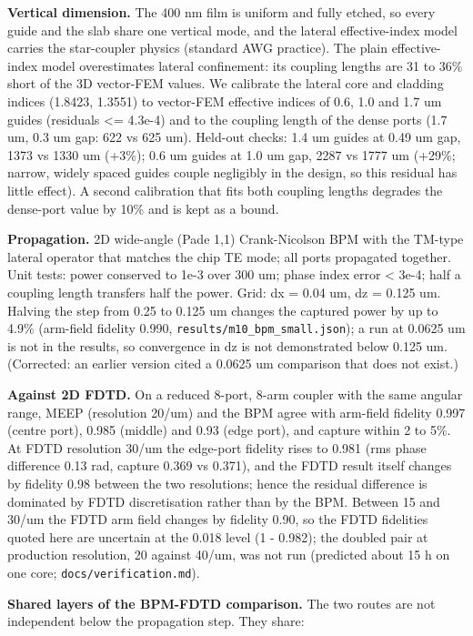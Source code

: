 \textbf{Vertical dimension.} The 400 nm film is uniform and fully
etched, so every guide and the slab share one vertical mode, and the
lateral effective-index model carries the star-coupler physics (standard
AWG practice). The plain effective-index model overestimates lateral
confinement: its coupling lengths are 31 to 36\% short of the 3D
vector-FEM values. We calibrate the lateral core and cladding indices
(1.8423, 1.3551) to vector-FEM effective indices of 0.6, 1.0 and 1.7 um
guides (residuals \textless= 4.3e-4) and to the coupling length of the
dense ports (1.7 um, 0.3 um gap: 622 vs 625 um). Held-out checks: 1.4 um
guides at 0.49 um gap, 1373 vs 1330 um (+3\%); 0.6 um guides at 1.0 um
gap, 2287 vs 1777 um (+29\%; narrow, widely spaced guides couple
negligibly in the design, so this residual has little effect). A second
calibration that fits both coupling lengths degrades the dense-port
value by 10\% and is kept as a bound.

\textbf{Propagation.} 2D wide-angle (Pade 1,1) Crank-Nicolson BPM with
the TM-type lateral operator that matches the chip TE mode; all ports
propagated together. Unit tests: power conserved to 1e-3 over 300 um;
phase index error \textless{} 3e-4; half a coupling length transfers
half the power. Grid: dx = 0.04 um, dz = 0.125 um. Halving the step from
0.25 to 0.125 um changes the captured power by up to 4.9\% (arm-field
fidelity 0.990, \texttt{results/m10\_bpm\_small.json}); a run at 0.0625
um is not in the results, so convergence in dz is not demonstrated below
0.125 um. (Corrected: an earlier version cited a 0.0625 um comparison
that does not exist.)

\textbf{Against 2D FDTD.} On a reduced 8-port, 8-arm coupler with the
same angular range, MEEP (resolution 20/um) and the BPM agree with
arm-field fidelity 0.997 (centre port), 0.985 (middle) and 0.93 (edge
port), and capture within 2 to 5\%. At FDTD resolution 30/um the
edge-port fidelity rises to 0.981 (rms phase difference 0.13 rad,
capture 0.369 vs 0.371), and the FDTD result itself changes by fidelity
0.98 between the two resolutions; hence the residual difference is
dominated by FDTD discretisation rather than by the BPM. Between 15 and
30/um the FDTD arm field changes by fidelity 0.90, so the FDTD
fidelities quoted here are uncertain at the 0.018 level (1 - 0.982); the
doubled pair at production resolution, 20 against 40/um, was not run
(predicted about 15 h on one core; \texttt{docs/verification.md}).

\textbf{Shared layers of the BPM-FDTD comparison.} The two routes are
not independent below the propagation step. They share:


